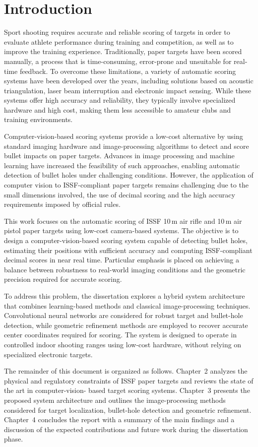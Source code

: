 \chapter{Introduction}
\label{chap:introduction}

Sport shooting requires accurate and reliable scoring of targets in order to evaluate athlete
performance during training and competition, as well as to improve the training experience.
Traditionally, paper targets have been scored
manually, a process that is time-consuming, error-prone and unsuitable for real-time feedback.
To overcome these limitations, a variety of automatic scoring systems have been developed over
the years, including solutions based on acoustic triangulation, laser beam interruption and
electronic impact sensing. While these systems offer high accuracy and reliability, they typically
involve specialized hardware and high cost, making them less accessible to amateur
clubs and training environments.

Computer-vision-based scoring systems provide a low-cost alternative by using standard
imaging hardware and image-processing algorithms to detect and score bullet impacts on paper
targets. Advances in image processing and machine learning have increased the feasibility of
such approaches, enabling automatic detection of bullet holes under challenging
conditions. However, the application of computer vision to ISSF-compliant paper targets remains
challenging due to the small dimensions involved, the use of decimal scoring and the high
accuracy requirements imposed by official rules.

This work focuses on the automatic scoring of ISSF 10\,m air rifle and 10\,m air pistol paper
targets using low-cost camera-based systems. The objective is to design a computer-vision-based
scoring system capable of detecting bullet holes, estimating their positions with sufficient
accuracy and computing ISSF-compliant decimal scores in near real time. Particular emphasis is
placed on achieving a balance between robustness to real-world imaging conditions and the
geometric precision required for accurate scoring.

To address this problem, the dissertation explores a hybrid system architecture that combines
learning-based methods and classical image-processing techniques. Convolutional neural networks
are considered for robust target and bullet-hole detection, while geometric refinement methods
are employed to recover accurate center coordinates required for scoring. The system is designed
to operate in controlled indoor shooting ranges using low-cost hardware, without relying on
specialized electronic targets.

The remainder of this document is organized as follows. Chapter~2 analyzes the physical and
regulatory constraints of ISSF paper targets and reviews the state of the art in computer-vision-
based target scoring systems. Chapter~3 presents the proposed system architecture and outlines
the image-processing methods considered for target localization, bullet-hole detection and
geometric refinement. Chapter~4 concludes the report with a summary of the main findings and a
discussion of the expected contributions and future work during the dissertation phase.


